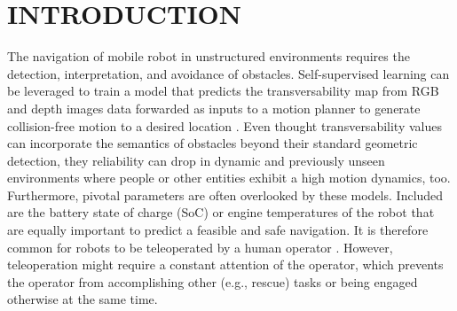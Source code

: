 \documentclass[letterpaper, 10 pt, conference]{ieeeconf}  %
\begin{document}
\section{INTRODUCTION}
The navigation of mobile robot in unstructured environments requires the detection, interpretation, and avoidance of obstacles. %
Self-supervised learning can be leveraged to train a model that predicts the transversability map from RGB and depth images data forwarded as inputs to a motion planner to generate collision-free motion to a desired location \cite{wayfaster,wayfast,leung2022hybrid,endo2024benchnav}. %
Even thought  transversability values can incorporate the semantics of obstacles beyond their standard geometric detection, they reliability can drop in dynamic and previously unseen environments \cite{frey2024roadrunner,muhamad2024robust} where people or other entities exhibit a high motion dynamics, too. Furthermore, pivotal parameters are often overlooked by these models. Included are the battery state of charge (SoC) or engine temperatures of the robot that are equally important to predict a feasible and safe navigation. It is therefore common for robots to be  teleoperated by a human operator \cite{huang2024evaluation,husky}. However, teleoperation might require a constant attention of the operator, which prevents the operator from accomplishing other (e.g., rescue) tasks or being engaged otherwise at the same time.
\end{document}
